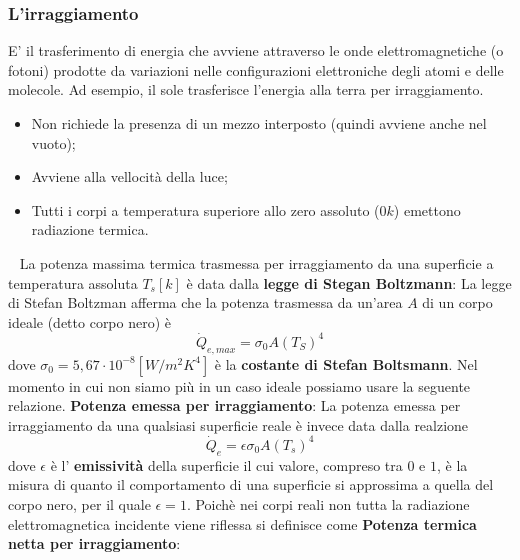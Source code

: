 \subsubsection{L'irraggiamento}
E’ il trasferimento di energia che avviene attraverso le onde elettromagnetiche (o
fotoni) prodotte da variazioni nelle configurazioni elettroniche degli atomi e delle
molecole.\newline
\newline
Ad esempio, il sole trasferisce l'energia alla terra per irraggiamento.\newline
\begin{itemize}
    \item Non richiede la presenza di un mezzo interposto (quindi avviene anche nel vuoto);
    \item Avviene alla vellocità della luce;
    \item Tutti i corpi a temperatura superiore allo zero assoluto ($0 k$) emettono radiazione termica.
\end{itemize}
\ \newline
La potenza massima termica trasmessa per irraggiamento da una superficie a temperatura assoluta $T_s [k]$ è data dalla \textbf{legge di Stegan Boltzmann}:\newline
La legge di Stefan Boltzman afferma che la potenza trasmessa da un'area $A$ di un corpo ideale (detto corpo nero) è 
\[
    \dot{Q}_{e, max} = \sigma_{0} A (T_S)^4
\]
dove $\sigma_{0} = 5,67 \cdot 10^{-8} [W/m^2K^4]$ è la \textbf{costante di Stefan Boltsmann}.\newline
\newline
Nel momento in cui non siamo più in un caso ideale possiamo usare la seguente relazione.\newline
\textbf{Potenza emessa per irraggiamento}:\newline
La potenza emessa per irraggiamento da una qualsiasi superficie reale è invece data dalla realzione
\[
    \dot{Q}_e = \epsilon \sigma_{0} A (T_s)^4
\]
dove $\epsilon$ è l' \textbf{emissività} della superficie il cui valore, compreso tra $0$ e $1$, è la misura di quanto il comportamento di una superficie si approssima a quella del corpo nero, per il quale $\epsilon = 1$.\newline
\newline
Poichè nei corpi reali non tutta la radiazione elettromagnetica incidente viene riflessa si definisce come \newline
\textbf{Potenza termica netta per irraggiamento}:\newline
